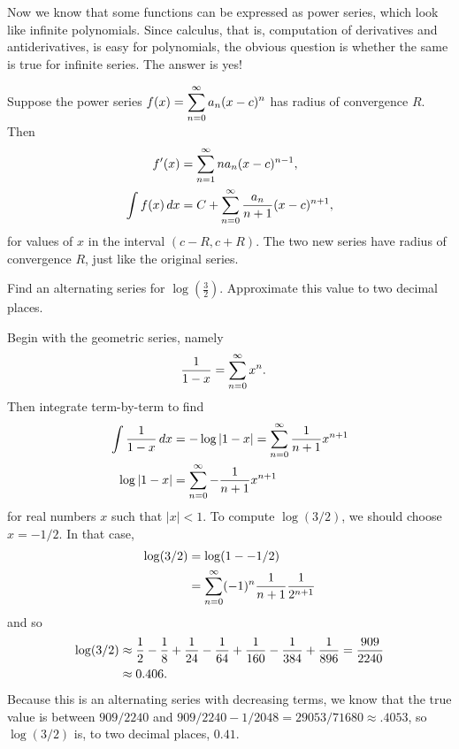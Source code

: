 \nobreak
Now we know that some functions can be expressed as power series,
which look like infinite polynomials. Since calculus, that is,
computation of derivatives and antiderivatives, is easy for
polynomials, the obvious question is whether the same is true
for infinite series. The answer is yes!

\begin{theorem}\label{thm:term-by-term-calculus}
Suppose the power series $f(x)=\displaystyle\sum_{n=0}^\infty a_n(x-c)^n$ has
radius of convergence $R$. Then 
\begin{align*}
  f'(x)&=\sum_{n=1}^\infty na_n(x-c)^{n-1}, \\
  \int f(x)\,dx &= C+\sum_{n=0}^\infty {a_n\over n+1}(x-c)^{n+1}, \\
\end{align*}
for values of $x$ in the interval $(c-R,c+R)$.  The two new series
have radius of convergence $R$, just like the original series.
\end{theorem}


\begin{example}
  \label{example:formula-for-log-three-halves}
  Find an alternating series for $\log \left(\frac{3}{2}\right)$.
  Approximate this value to two decimal places.
\end{example}

\begin{solution}
Begin with the geometric series, namely
\begin{align*}
  {1\over 1-x} &= \sum_{n=0}^\infty x^n.
\end{align*}
Then integrate term-by-term to find
\begin{align*}
  \int{1\over 1-x}\,dx &= -\log|1-x| = \sum_{n=0}^\infty {1\over
    n+1}x^{n+1} \\
  \log|1-x| &= \sum_{n=0}^\infty -{1\over n+1}x^{n+1} \\
\end{align*}
for real numbers $x$ such that $|x|<1$.  To compute $\log(3/2)$, we
should choose $x = -1/2$.  In that case,
\begin{align*}
  \log(3/2)&=\log(1--1/2) \\
  &= \sum_{n=0}^\infty (-1)^n{1\over n+1}{1\over 2^{n+1}}
\end{align*}
and so
\begin{align*}
  \log(3/2) &\approx {1\over 2}-{1\over 8}+{1\over 24}-{1\over 64}
  +{1\over 160}-{1\over 384}+{1\over 896} ={909\over 2240}\\
  &\approx 0.406.
\end{align*}
Because this is an alternating series with decreasing terms,
we know that the true value is between $909/2240$ and
$909/2240-1/2048=29053/71680\approx .4053$, so $\log(3/2)$ is, to two decimal
places, $0.41$. 
\end{solution}

